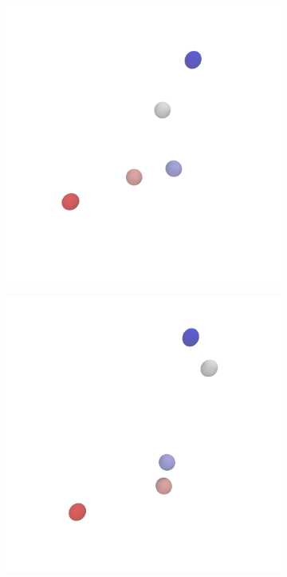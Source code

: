 \documentclass[a4paper,10pt,bibtotoc]{scrartcl}
\begin{document}
\begin{figure}
    \begin{subfigure}[t]{.5\textwidth}
        \centering
        \caption{}
        \includegraphics[width=.8\linewidth]{scene1.png}
        \label{fig:sfig1}
    \end{subfigure}\hfill %
    \begin{subfigure}[t]{.5\textwidth}
        \centering
        \caption{}
        \includegraphics[width=.8\linewidth]{scene2.png}
        \label{fig:sfig1}
    \end{subfigure}
    \begin{subfigure}[t]{.5\textwidth}

\end{subfigure}
\end{figure}
\end{document}

